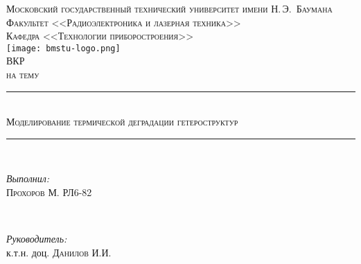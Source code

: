 \newcommand{\HRule}{\rule{\linewidth}{.5mm}\\}

\begin{center}

\textsc{\large Московский государственный технический университет имени Н.\,Э.~Баумана}\\[5mm]
\textsc{Факультет <<Радиоэлектроника и лазерная техника>>}\\
\textsc{Кафедра <<Технологии приборостроения>>}\\[2.5mm]

\texttt{[image: bmstu-logo.png]}\\[0.5cm]

\textsc{\large ВКР}\\
\textsc{на тему}

\HRule[0.5cm]
{\huge \textsc{Моделирование термической деградации гетероструктур}}
\HRule[3cm]


        \begin{minipage}{0.4\textwidth}
            \begin{flushleft} \large
                \emph{Выполнил:}\\
                \textsc{Прохоров} М. РЛ6-82
            \end{flushleft}
        \end{minipage}
        ~
        \begin{minipage}{0.5\textwidth}
            \begin{flushright} \large
                \emph{Руководитель:} \\
                к.т.н. доц. \textsc{Данилов} И.И.
            \end{flushright}
        \end{minipage}\\[1cm]


\vfill




\end{center}

\newpage
{}


